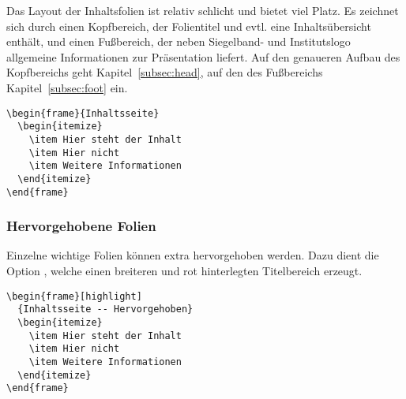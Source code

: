 Das Layout der Inhaltsfolien ist relativ schlicht und bietet viel Platz.
Es zeichnet sich durch einen Kopfbereich, der Folientitel und evtl. eine
Inhaltsübersicht enthält, und einen Fußbereich, der neben Siegelband- und
Institutslogo allgemeine Informationen zur Präsentation liefert.
Auf den genaueren Aufbau des Kopfbereichs geht Kapitel~\ref{subsec:head},
auf den des Fußbereichs Kapitel~\ref{subsec:foot} ein.

\begin{minipage}{0.5\textwidth}
\begin{verbatim}
\begin{frame}{Inhaltsseite}
  \begin{itemize}
    \item Hier steht der Inhalt
    \item Hier nicht
    \item Weitere Informationen
  \end{itemize}
\end{frame}
\end{verbatim}
\end{minipage}
\begin{minipage}{0.5\textwidth}
\end{minipage}

\subsubsection{Hervorgehobene Folien}

Einzelne wichtige Folien können extra hervorgehoben werden.
Dazu dient die Option ,
welche einen breiteren und rot hinterlegten Titelbereich erzeugt.

\begin{minipage}{0.5\textwidth}
\begin{verbatim}
\begin{frame}[highlight]
  {Inhaltsseite -- Hervorgehoben}
  \begin{itemize}
    \item Hier steht der Inhalt
    \item Hier nicht
    \item Weitere Informationen
  \end{itemize}
\end{frame}
\end{verbatim}
\end{minipage}
\begin{minipage}{0.5\textwidth}
\end{minipage}

